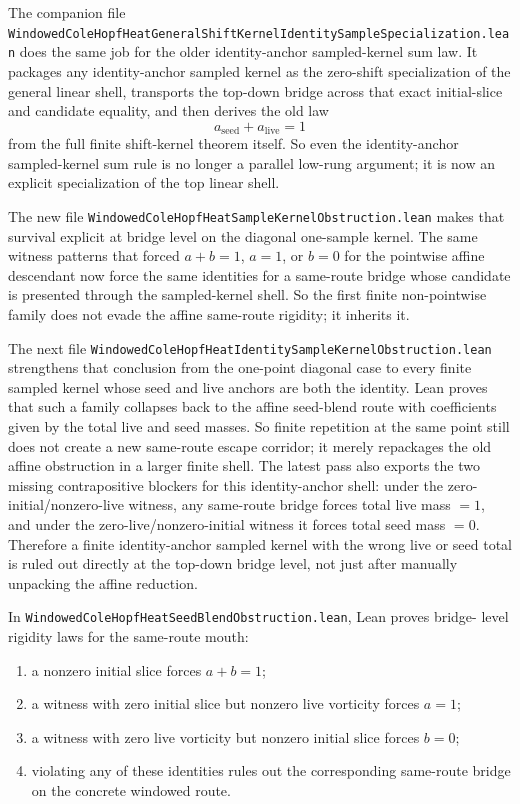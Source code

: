 \documentclass[11pt]{article}
\begin{document}
The companion file
\texttt{WindowedColeHopfHeatGeneralShiftKernelIdentitySampleSpecialization.lean}
does the same job for the older identity-anchor sampled-kernel sum law.  It
packages any identity-anchor sampled kernel as the zero-shift specialization of
the general linear shell, transports the top-down bridge across that exact
initial-slice and candidate equality, and then derives the old law
\[
  a_{\mathrm{seed}} + a_{\mathrm{live}} = 1
\]
from the full finite shift-kernel theorem itself.  So even the identity-anchor
sampled-kernel sum rule is no longer a parallel low-rung argument; it is now an
explicit specialization of the top linear shell.

The new file \texttt{WindowedColeHopfHeatSampleKernelObstruction.lean} makes
that survival explicit at bridge level on the diagonal one-sample kernel.  The
same witness patterns that forced \(a+b=1\), \(a=1\), or \(b=0\) for the
pointwise affine descendant now force the same identities for a same-route
bridge whose candidate is presented through the sampled-kernel shell.  So the
first finite non-pointwise family does not evade the affine same-route
rigidity; it inherits it.

The next file
\texttt{WindowedColeHopfHeatIdentitySampleKernelObstruction.lean} strengthens
that conclusion from the one-point diagonal case to every finite sampled kernel
whose seed and live anchors are both the identity.  Lean proves that such a
family collapses back to the affine seed-blend route with coefficients given by
the total live and seed masses.  So finite repetition at the same point still
does not create a new same-route escape corridor; it merely repackages the old
affine obstruction in a larger finite shell.  The latest pass also exports the
two missing contrapositive blockers for this identity-anchor shell: under the
zero-initial/nonzero-live witness, any same-route bridge forces total live mass
\(=1\), and under the zero-live/nonzero-initial witness it forces total seed
mass \(=0\).  Therefore a finite identity-anchor sampled kernel with the wrong
live or seed total is ruled out directly at the top-down bridge level, not just
after manually unpacking the affine reduction.

In \texttt{WindowedColeHopfHeatSeedBlendObstruction.lean}, Lean proves bridge-
level rigidity laws for the same-route mouth:
\begin{enumerate}[leftmargin=1.5em]
  \item a nonzero initial slice forces \(a+b=1\);
  \item a witness with zero initial slice but nonzero live vorticity forces
  \(a=1\);
  \item a witness with zero live vorticity but nonzero initial slice forces
  \(b=0\);
  \item violating any of these identities rules out the corresponding
  same-route bridge on the concrete windowed route.
\end{enumerate}
\end{document}
